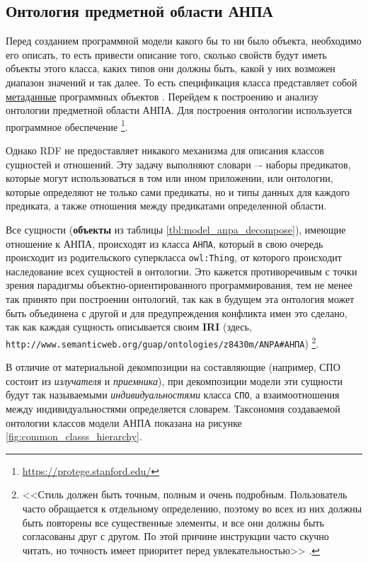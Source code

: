 \subsection{Онтология предметной области АНПА}

Перед созданием программной модели какого бы то ни было объекта, необходимо его описать,
то есть привести описание того, сколько свойств будут иметь объекты этого класса,
каких типов они должны быть, какой у них возможен диапазон значений и так далее.
То есть спецификация класса представляет собой \underline{метаданные} программных объектов \cite{journal:vestnik_spbgu:ivakin}.
Перейдем к построению и анализу онтологии предметной области АНПА.
Для построения онтологии используется программное обеспечение
\protege\footnote{\url{https://protege.stanford.edu/}}.

%
Однако RDF не предоставляет никакого механизма для описания классов сущностей и
отношений. Эту задачу выполняют словари –- наборы предикатов, которые могут
использоваться в том или ином приложении, или онтологии, которые определяют не только
сами предикаты, но и типы данных для каждого предиката, а также отношения между
предикатами определенной области.

Все сущности (\textbf{объекты} из таблицы \ref{tbl:model_anpa_decompose}), имеющие отношение к АНПА, происходят из класса \texttt{АНПА},
который в свою очередь происходит из родительского суперкласса \texttt{owl:Thing},
от которого происходит наследование всех сущностей в онтологии.
Это кажется противоречивым с точки зрения парадигмы объектно-ориентированного программирования,
тем не менее так принято при построении онтологий, так как в будущем эта онтология может быть объединена с другой
и для предупреждения конфликта имен это сделано, так как каждая сущность описывается своим \textbf{IRI}
(здесь, \texttt{http://www.semanticweb.org/guap/ontologies/z8430m/ANPA\#АНПА}) \cite[раздел 2.1]{journal:vestnik_vgtu:shapkin}\footnote{%
<<Стиль должен быть точным, полным и очень подробным. Пользователь часто обращается к отдельному определению,
    поэтому во всех из них должны быть повторены все существенные элементы, и все они должны быть согласованы друг с другом.
    По этой причине инструкции часто скучно читать, но точность имеет приоритет перед увлекательностью>> \cite[гл.~6]{book:bruks:myth_mount_man}.
}.

В отличие от материальной декомпозиции на составляющие (например, СПО состоит из \textit{излучателя} и \textit{приемника}),
при декомпозиции модели эти сущности будут так называемыми \textit{индивидуальностями} класса \texttt{СПО},
а взаимоотношения между индивидуальностями определяется словарем.
Таксономия создаваемой онтологии классов модели АНПА показана на рисунке \ref{fig:common_classs_hierarchy}.


